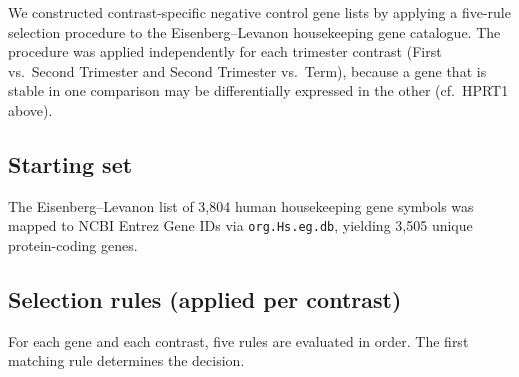 \documentclass[11pt,a4paper]{article}
\begin{document}
We constructed contrast-specific negative control gene lists by
applying a five-rule selection procedure to the Eisenberg--Levanon
housekeeping gene catalogue.  The procedure was applied independently
for each trimester contrast (First vs.\ Second Trimester and Second
Trimester vs.\ Term), because a gene that is stable in one comparison
may be differentially expressed in the other (cf.\ HPRT1 above).

\subsection{Starting set}

The Eisenberg--Levanon list of 3{,}804 human housekeeping gene symbols
was mapped to NCBI Entrez Gene IDs via \texttt{org.Hs.eg.db}, yielding
3{,}505 unique protein-coding genes.

\subsection{Selection rules (applied per contrast)}

For each gene and each contrast, five rules are evaluated in order.
The first matching rule determines the decision.
\end{document}
